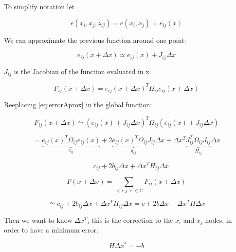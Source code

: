 To simplify notation let 

$$
e(x_i,x_j,z_{ij}) = e(x_i,x_j) = e_{ij}(x)
$$

We can approximate the previous function around one point:

\begin{equation}
\label{eq:errorAprox}
e_{ij}(x + \Delta x) \simeq e_{ij}(x) + J_{ij} \Delta x
\end{equation}

$J_{ij}$ is the Jacobian of the function evaluated in x. 


\begin{equation}
\label{eq:globalFunc}
F_{ij}(x + \Delta x) = e_{ij}(x + \Delta x)^T \Omega_{ij}  e_{ij}(x + \Delta x)
\end{equation}

Reeplacing \ref{eq:errorAprox} in the global function:

\begin{equation}
\label{eq:globalFuncAprox}
F_{ij}(x + \Delta x) \simeq (e_{ij}(x) + J_{ij} \Delta x)^T \Omega_{ij}  (e_{ij}(x) + J_{ij} \Delta x)
\end{equation}

\begin{equation}
\label{eq:globalFuncAprox2}
 =  \underbrace{e_{ij}(x)^T \Omega_{ij} e_{ij}(x)}_{c_{ij}} + 2  \underbrace{e_{ij}(x)^T \Omega_{ij} J_{ij}}_{b_{ij}} \Delta x + \Delta x^T \underbrace{ J_{ij}^T  \Omega_{ij} J_{ij}}_{H_{ij}} \Delta x
\end{equation}

\begin{equation}
\label{eq:globalFuncAprox2}
 = c_{ij} + 2 b_{ij} \Delta x + \Delta x^T H_{ij} \Delta x
\end{equation}


\begin{equation}
F(x + \Delta x) =  \sum\limits_{<i,j> \in C } F_{ij}(x + \Delta x) 
\end{equation}



\begin{equation}
\simeq  c_{ij} + 2 b_{ij} \Delta x + \Delta x^T H_{ij} \Delta x
=   c + 2 b \Delta x + \Delta x^T H \Delta x
\end{equation}

Then we want to know $\Delta x^T$, this is the correction to the $x_i$ and $x_j$ nodes, in order 
to have a minimum error:

\begin{equation}
H \Delta x^* = -b
\end{equation}

